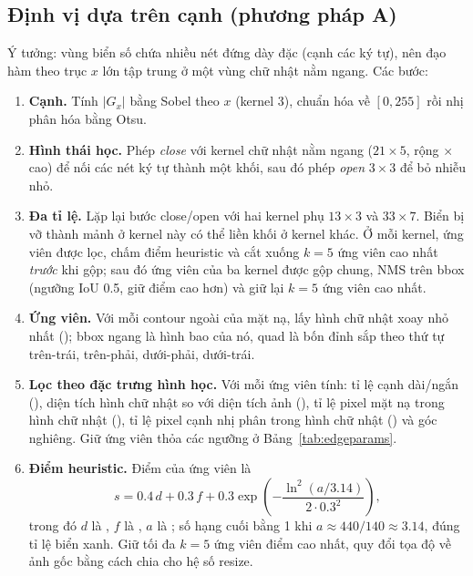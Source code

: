 \subsection{Định vị dựa trên cạnh (phương pháp A)}
\label{sec:edge}

Ý tưởng: vùng biển số chứa nhiều nét đứng dày đặc (cạnh các ký tự), nên đạo hàm theo trục $x$ lớn tập trung ở một vùng chữ nhật nằm ngang. Các bước:
\begin{enumerate}
  \item \textbf{Cạnh.} Tính $|G_x|$ bằng Sobel theo $x$ (kernel 3), chuẩn hóa về $[0,255]$ rồi nhị phân hóa bằng Otsu.
  \item \textbf{Hình thái học.} Phép \emph{close} với kernel chữ nhật nằm ngang ($21\times 5$, rộng $\times$ cao) để nối các nét ký tự thành một khối, sau đó phép \emph{open} $3\times 3$ để bỏ nhiễu nhỏ.
  \item \textbf{Đa tỉ lệ.} Lặp lại bước close/open với hai kernel phụ $13\times 3$ và $33\times 7$. Biển bị vỡ thành mảnh ở kernel này có thể liền khối ở kernel khác. Ở mỗi kernel, ứng viên được lọc, chấm điểm heuristic và cắt xuống $k=5$ ứng viên cao nhất \emph{trước} khi gộp; sau đó ứng viên của ba kernel được gộp chung, NMS trên bbox (ngưỡng IoU 0.5, giữ điểm cao hơn) và giữ lại $k=5$ ứng viên cao nhất.
  \item \textbf{Ứng viên.} Với mỗi contour ngoài của mặt nạ, lấy hình chữ nhật xoay nhỏ nhất (); bbox ngang là hình bao của nó, quad là bốn đỉnh sắp theo thứ tự trên-trái, trên-phải, dưới-phải, dưới-trái.
  \item {\sloppy \textbf{Lọc theo đặc trưng hình học.} Với mỗi ứng viên tính: tỉ lệ cạnh dài/ngắn (), diện tích hình chữ nhật so với diện tích ảnh (), tỉ lệ pixel mặt nạ trong hình chữ nhật (), tỉ lệ pixel cạnh nhị phân trong hình chữ nhật () và góc nghiêng. Giữ ứng viên thỏa các ngưỡng ở Bảng~\ref{tab:edgeparams}.\par}
  \item \textbf{Điểm heuristic.} Điểm của ứng viên là
  \begin{equation}
    s = 0.4\,d + 0.3\,f + 0.3\exp\!\left(-\frac{\ln^2(a/3.14)}{2\cdot 0.3^2}\right),
  \end{equation}
  trong đó $d$ là , $f$ là , $a$ là ; số hạng cuối bằng 1 khi $a\approx 440/140\approx 3.14$, đúng tỉ lệ biển xanh. Giữ tối đa $k=5$ ứng viên điểm cao nhất, quy đổi tọa độ về ảnh gốc bằng cách chia cho hệ số resize.
\end{enumerate}

